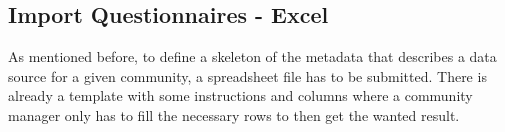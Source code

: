 \subsection{Import Questionnaires - Excel}
\label{subsection:excel}


As mentioned before, to define a skeleton of the metadata that describes a data source for a given community, a spreadsheet file has to be submitted.
There is already a template with some instructions and columns where a community manager only has to fill the necessary rows to then get the wanted result.

